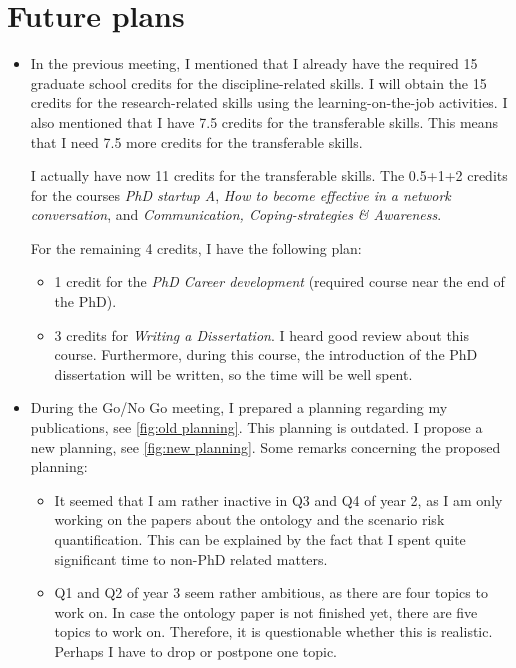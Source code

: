 \documentclass[10pt,final,a4paper,oneside,onecolumn]{article}
\begin{document}
\section{Future plans}
\label{sec:future}

\begin{itemize}
	\item In the previous meeting, I mentioned that I already have the required 15 graduate school credits for the discipline-related skills. I will obtain the 15 credits for the research-related skills using the learning-on-the-job activities. I also mentioned that I have 7.5 credits for the transferable skills. This means that I need 7.5 more credits for the transferable skills.
	
	I actually have now 11 credits for the transferable skills. The 0.5+1+2 credits for the courses \emph{PhD startup A}, \emph{How to become effective in a network conversation}, and \emph{Communication, Coping-strategies \& Awareness}.
	
	For the remaining 4 credits, I have the following plan:
	\begin{itemize}
		\item 1 credit for the \emph{PhD Career development} (required course near the end of the PhD).
		\item 3 credits for \emph{Writing a Dissertation}. I heard good review about this course. Furthermore, during this course, the introduction of the PhD dissertation will be written, so the time will be well spent.
	\end{itemize}
	\item During the Go/No Go meeting, I prepared a planning regarding my publications, see \cref{fig:old planning}. This planning is outdated. I propose a new planning, see \cref{fig:new planning}. Some remarks concerning the proposed planning:
	\begin{itemize}
		\item It seemed that I am rather inactive in Q3 and Q4 of year 2, as I am only working on the papers about the ontology and the scenario risk quantification. This can be explained by the fact that I spent quite significant time to non-PhD related matters.
		\item Q1 and Q2 of year 3 seem rather ambitious, as there are four topics to work on. In case the ontology paper is not finished yet, there are five topics to work on. Therefore, it is questionable whether this is realistic. Perhaps I have to drop or postpone one topic. 
	\end{itemize}


\end{itemize}
\end{document}
